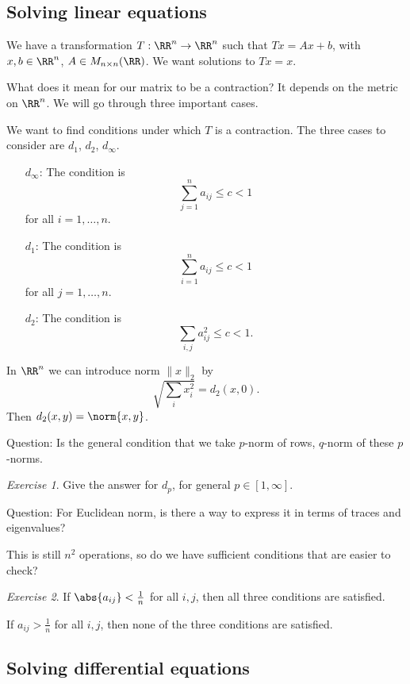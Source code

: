 \documentclass{article}
\theoremstyle{remark}
\newtheorem{exercise}{Exercise}
\begin{document}
\subsection{Solving linear equations}

We have a transformation $T:\RR^n\to\RR^n$ such that 
$Tx = Ax+b$, with $x,b\in\RR^n$, $A\in M_{n\times n}(\RR)$.
We want solutions to $Tx=x$.

What does it mean for our matrix to be a contraction? It 
depends on the metric on $\RR^n$. We will go through three 
important cases.

We want to find conditions under which $T$ is a contraction.
The three cases to consider are $d_1$, $d_2$, $d_\infty$.

\begin{enumerate}
    \item[$d_\infty$:] The condition is 
        \[\sum_{j=1}^n a_{ij} \le c < 1\]
        for all $i=1,\ldots,n$.
    \item[$d_1$:] The condition is 
        \[ \sum_{i=1}^n a_{ij} \le c < 1 \]
        for all $j=1,\ldots,n$.
    \item[$d_2$:] The condition is 
        \[ \sum_{i,j} a_{ij}^2 \le c < 1. \]
\end{enumerate}


In $\RR^n$ we can introduce norm $\|x\|_2$
by 
\[ \sqrt{\sum_i x_i^2}=d_2(x,0).\]
Then $d_2(x,y) = \norm{x,y}$.

Question: Is the general condition that we take $p$-norm of rows,
$q$-norm of these $p$-norms.

\begin{exercise}
    Give the answer for $d_p$, for general $p\in [1,\infty]$.
\end{exercise}

Question: For Euclidean norm, is there a way to express it 
in terms of traces and eigenvalues?
 
This is still $n^2$ operations, so do we have sufficient conditions
that are easier to check?

\begin{exercise}
    If $\abs{a_{ij}} < \frac{1}{n}$ for all $i,j$, then
    all three conditions are satisfied.

    If $a_{ij} > \frac{1}{n}$ for all $i,j$, then none of the 
    three conditions are satisfied.
\end{exercise}

\subsection{Solving differential equations}
\end{document}

